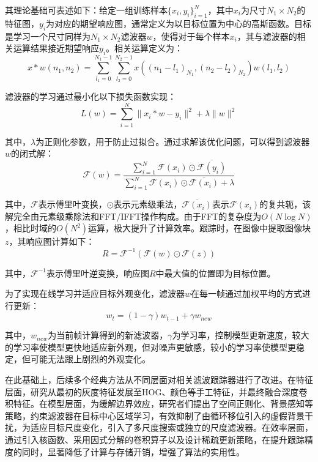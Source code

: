 其理论基础可表述如下：给定一组训练样本$\{x_i, y_i\}_{i=1}^N$，其中$x_i$为尺寸$N_1 \times N_2$的特征图，$y_i$为对应的期望响应图，通常定义为以目标位置为中心的高斯函数。目标是学习一个尺寸同样为$N_1 \times N_2$滤波器$w$，使得对于每个样本$x_i$，其与滤波器的相关运算结果接近期望响应$y_i$。相关运算定义为：
\begin{equation}
    x * w\left(n_1, n_2\right)=\sum_{l_1=0}^{N_1-1} \sum_{l_2=0}^{N_2-1} x\left(\left(n_1-l_1\right)_{N_1},\left(n_2-l_2\right)_{N_2}\right) w\left(l_1, l_2\right)
\end{equation}

滤波器的学习通过最小化以下损失函数实现：
\begin{equation}
    L(w) = \sum_{i=1}^N \|x_i * w - y_i\|^2 + \lambda \|w\|^2
\end{equation}

其中，$\lambda$为正则化参数，用于防止过拟合。通过求解该优化问题，可以得到滤波器$w$的闭式解：
\begin{equation}
    \mathcal{F}(w) = \frac{\sum_{i=1}^N \mathcal{F}(x_i) \odot \overline{\mathcal{F}(y_i)}}{\sum_{i=1}^N \mathcal{F}(x_i) \odot \overline{\mathcal{F}(x _i)} + \lambda}
\end{equation}

其中，$\mathcal{F}$表示傅里叶变换，$\odot$表示元素级乘法，$\overline{\mathcal{F}(x_i)}$表示$\mathcal{F}(x_i)$的复共轭，该解完全由元素级乘除法和FFT/IFFT操作构成。由于FFT的复杂度为$O(N \log N)$，相比时域的$O(N^2)$运算，极大提升了计算效率。跟踪时，在图像中提取图像块$z$，其响应图计算如下：
\begin{equation}
    R = \mathcal{F}^{-1}(\mathcal{F}(w) \odot \mathcal{F}(z))
\end{equation}

其中，$\mathcal{F}^{-1}$表示傅里叶逆变换，响应图$R$中最大值的位置即为目标位置。

为了实现在线学习并适应目标外观变化，滤波器$w$在每一帧通过加权平均的方式进行更新：
\begin{equation}
    w_t = (1 - \gamma) w_{t-1} + \gamma w_{new}
\end{equation}

其中，$w_{new}$为当前帧计算得到的新滤波器，$\gamma$为学习率，控制模型更新速度，较大的学习率使模型更快地适应新外观，但对噪声更敏感，较小的学习率使模型更稳定，但可能无法跟上剧烈的外观变化。

在此基础上，后续多个经典方法从不同层面对相关滤波跟踪器进行了改进。在特征层面，研究从最初的灰度特征发展至HOG、颜色等手工特征，并最终融合深度卷积特征。在模型层面，为缓解边界效应，研究者们提出了空间正则化、背景感知等策略，约束滤波器在目标中心区域学习，有效抑制了由循环移位引入的虚假背景干扰，为适应目标尺度变化，引入了多尺度搜索或独立的尺度滤波器。在效率层面，通过引入核函数、采用因式分解的卷积算子以及设计稀疏更新策略，在提升跟踪精度的同时，显著降低了计算与存储开销，增强了算法的实用性。


